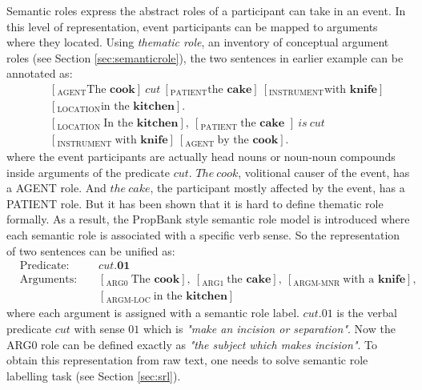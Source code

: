 \documentclass[a4paper]{article}
\begin{document}
Semantic roles express the abstract roles of a participant can take in an event. In this level of representation, event participants can be mapped to arguments where they located. Using \textit{thematic role}, an inventory of conceptual argument roles (see Section \ref{sec:semanticrole}), the two sentences in earlier example can be annotated as: 
\begin{eqnarray} \label{eg:thematic}
  \nonumber & &[_{\text{AGENT}} \text{The }\textbf{cook}]\ cut\ [_{\text{PATIENT}}\text{the }\textbf{cake}]\ [_{\text{INSTRUMENT}}\text{with }\textbf{knife}]\\  
    & &[_{\text{LOCATION}}\text{in the }\textbf{kitchen}]. \\
  \nonumber & &[_{\text{LOCATION }}\text{In the }\textbf{kitchen}],\ [_{\text{PATIENT }}\text{the }\textbf{cake }]\ is \ cut\ \\
    & &[_{\text{INSTRUMENT }}\text{with }\textbf{knife}]\ [_{\text{AGENT }}\text{by the }\textbf{cook}]. 
\end{eqnarray} 
where the event participants are actually head nouns or noun-noun compounds inside arguments of the predicate $cut$. $The\ cook$, volitional causer of the event, has a AGENT role. And $the\ cake$, the participant mostly affected by the event, has a PATIENT role. But it has been shown that it is hard to define thematic role formally. As a result, the PropBank \citep{palmer2005proposition} style semantic role model is introduced where each semantic role is associated with a specific verb sense. So the representation of two sentences can be unified as: 
\begin{equation*} \label{eg:probank}
\begin{aligned}
    & \text{Predicate: }&&cut.\textbf{01} \\
    & \text{Arguments: }&&[_{\text{ARG0 }}\text{The }\textbf{cook}], \ [_{\text{ARG1 }}\text{the }\textbf{cake}], \ [_{\text{ARGM-MNR }}\text{with a }\textbf{knife}], \\
    &           &&[_{\text{ARGM-LOC }}\text{in the }\textbf{kitchen}]
\end{aligned}
\end{equation*} 
where each argument is assigned with a semantic role label. $cut.01$ is the verbal predicate $cut$ with sense $01$ which is \textit{"make an incision or separation"}. Now the ARG0 role can be defined exactly as \textit{"the subject which makes incision"}. To obtain this representation from raw text, one needs to solve semantic role labelling task (see Section \ref{sec:srl}). 
\end{document}

